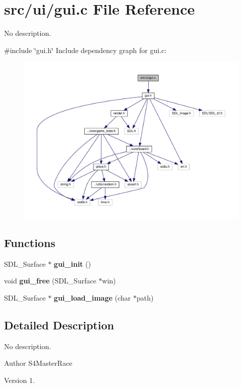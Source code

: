 \section{src/ui/gui.c File Reference}
\label{gui_8c}


No description.  


{\ttfamily \#include \char`\"{}gui.\+h\char`\"{}}\newline
Include dependency graph for gui.\+c\+:
\nopagebreak
\begin{figure}[H]
\begin{center}
\leavevmode
\includegraphics[width=350pt]{gui_8c__incl}
\end{center}
\end{figure}
\subsection*{Functions}
\begin{DoxyCompactItemize}
\item 
S\+D\+L\+\_\+\+Surface $\ast$ \textbf{ gui\+\_\+init} ()
\item 
void \textbf{ gui\+\_\+free} (S\+D\+L\+\_\+\+Surface $\ast$win)
\item 
S\+D\+L\+\_\+\+Surface $\ast$ \textbf{ gui\+\_\+load\+\_\+image} (char $\ast$path)
\end{DoxyCompactItemize}


\subsection{Detailed Description}
No description. 

\begin{DoxyAuthor}{Author}
S4\+Master\+Race 
\end{DoxyAuthor}
\begin{DoxyVersion}{Version}
1. 
\end{DoxyVersion}


